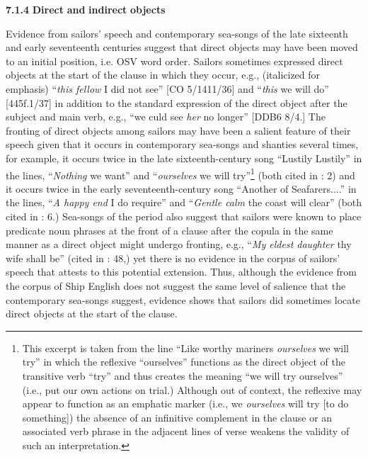   \textbf{7.1.4} \textbf{Direct} \textbf{and} \textbf{indirect} \textbf{objects} 

Evidence from sailors’ speech and contemporary sea-songs of the late sixteenth and early seventeenth centuries suggest that direct objects may have been moved to an initial position, i.e. OSV word order. Sailors sometimes expressed direct objects at the start of the clause in which they occur, e.g., (italicized for emphasis) “\textit{this fellow} I did not see” [CO 5/1411/36] and “\textit{this} we will do” [445f.1/37] in addition to the standard expression of the direct object after the subject and main verb, e.g., “we culd see \textit{her} no longer” [DDB6 8/4.] The fronting of direct objects among sailors may have been a salient feature of their speech given that it occurs in contemporary sea-songs and shanties several times, for example, it occurs twice in the late sixteenth-century song “Lustily Lustily” in the lines, “\textit{Nothing} we want” and “\textit{ourselves} we will try”\footnote{This excerpt is taken from the line “Like worthy mariners \textit{ourselves} we will try” in which the reflexive “ourselves” functions as the direct object of the transitive verb “try” and thus creates the meaning “we will try ourselves” (i.e., put our own actions on trial.) Although out of context, the reflexive may appear to function as an emphatic marker (i.e., we \textit{ourselves} will try [to do something]) the absence of an infinitive complement in the clause or an associated verb phrase in the adjacent lines of verse weakens the validity of such an interpretation.}  (both cited in \citealt{Palmer1986}: 2) and it occurs twice in the early seventeenth-century song “Another of Seafarers....” in the lines,  “\textit{A happy end} I do require” and “\textit{Gentle calm} the coast will clear” (both cited in \citealt{Palmer1986}: 6.) Sea-songs of the period also suggest that sailors were known to place predicate noun phrases at the front of a clause after the copula in the same manner as a direct object might undergo fronting, e.g., “\textit{My eldest daughter} thy wife shall be” (cited in \citealt{Palmer1986}: 48,) yet there is no evidence in the corpus of sailors’ speech that attests to this potential extension. Thus, although the evidence from the corpus of Ship English does not suggest the same level of salience that the contemporary sea-songs suggest, evidence shows that sailors did sometimes locate direct objects at the start of the clause. 

